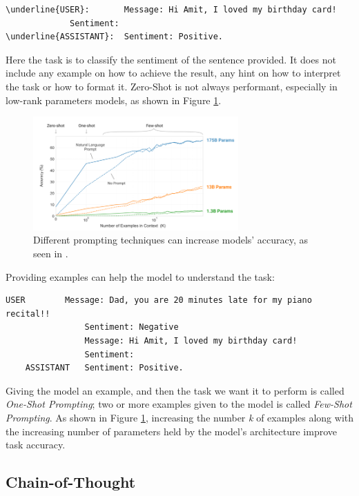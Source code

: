 \begin{Verbatim}[breaklines=true]
\underline{USER}:       Message: Hi Amit, I loved my birthday card!
             Sentiment:
\underline{ASSISTANT}:  Sentiment: Positive. 
\end{Verbatim}

Here the task is to classify the sentiment of the sentence provided. It does not include any example on how to achieve the result, any hint on how to interpret the task or how to format it. Zero-Shot is not always performant, especially in low-rank parameters models, as shown in Figure \ref{fig:prompting-accuracy}.

\begin{figure}[h]
    \centering
    \includegraphics[width=0.7\textwidth]{images/accuracy-prompting-techniques.png}
    \caption{Different prompting techniques can increase models' accuracy, as seen in \cite{brown2020language}.}
    \label{fig:prompting-accuracy}
\end{figure}

Providing examples can help the model to understand the task:

\begin{Verbatim}[breaklines=true]
    USER        Message: Dad, you are 20 minutes late for my piano recital!!
                Sentiment: Negative
                Message: Hi Amit, I loved my birthday card!
                Sentiment:
    ASSISTANT   Sentiment: Positive.
\end{Verbatim}

Giving the model an example, and then the task we want it to perform is called \textit{One-Shot Prompting}; two or more examples given to the model is called \textit{Few-Shot Prompting}. As shown in Figure \ref{fig:prompting-accuracy}, increasing the number \textit{k} of examples along with the increasing number of parameters held by the model's architecture improve task accuracy.


\subsection{Chain-of-Thought}
\label{sec:cot-prompting}

